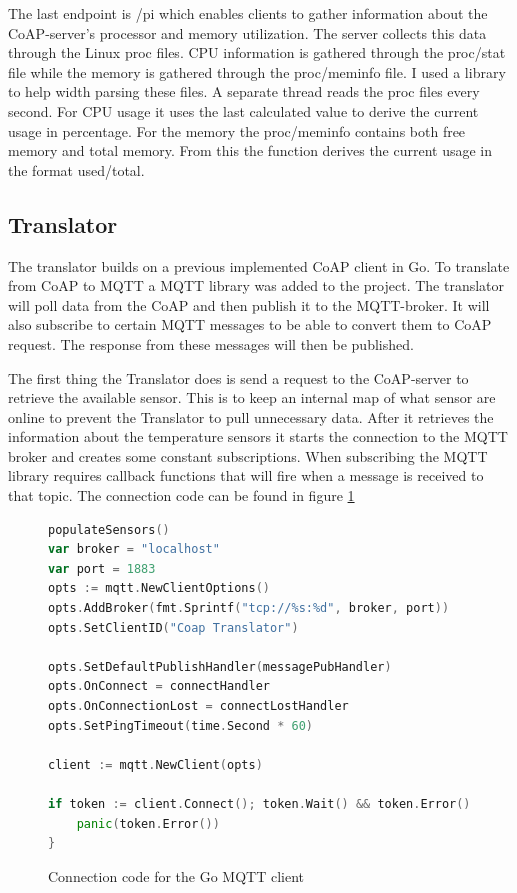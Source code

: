 The last endpoint is /pi which enables clients to gather information about the CoAP-server's processor and memory utilization. The server collects this data through the Linux proc files. CPU information is gathered through the proc/stat file while the memory is gathered through the proc/meminfo file. I used a library to help width parsing these files\cite{goProc}. A separate thread reads the proc files every second. For CPU usage it uses the last calculated value to derive the current usage in percentage. For the memory the proc/meminfo contains both free memory and total memory. From this the function derives the current usage in the format used/total.

\subsection{Translator}
The translator builds on a previous implemented CoAP client in Go. To translate from CoAP to MQTT a MQTT library was added to the project\cite{goMQTT}. The translator will poll data from the CoAP and then publish it to the MQTT-broker. It will also subscribe to certain MQTT messages to be able to convert them to CoAP request. The response from these messages will then be published.

The first thing the Translator does is send a request to the CoAP-server to retrieve the available sensor. This is to keep an internal map of what sensor are online to prevent the Translator to pull unnecessary data. After it retrieves the information about the temperature sensors it starts the connection to the MQTT broker and creates some constant subscriptions. When subscribing the MQTT library requires callback functions that will fire when a message is received to that topic. The connection code can be found in figure \ref{code:translator:connect}

\begin{figure}[H]
    \begin{lstlisting}[language=go]
populateSensors()
var broker = "localhost"
var port = 1883
opts := mqtt.NewClientOptions()
opts.AddBroker(fmt.Sprintf("tcp://%s:%d", broker, port))
opts.SetClientID("Coap Translator")

opts.SetDefaultPublishHandler(messagePubHandler)
opts.OnConnect = connectHandler
opts.OnConnectionLost = connectLostHandler
opts.SetPingTimeout(time.Second * 60)

client := mqtt.NewClient(opts)

if token := client.Connect(); token.Wait() && token.Error() != nil {
    panic(token.Error())
}
\end{lstlisting}
    \caption{Connection code for the Go MQTT client}
    \label{code:translator:connect}
\end{figure}

